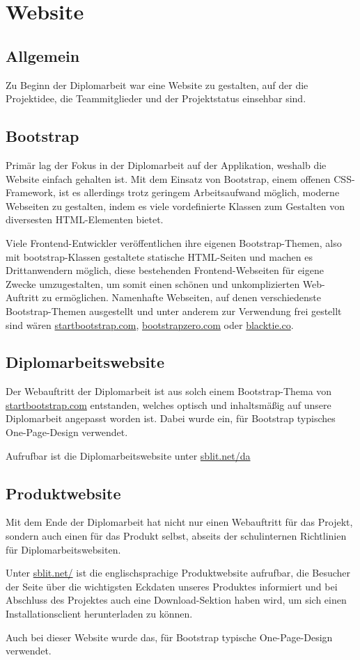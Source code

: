 \chapter{Website}
\section{Allgemein}
Zu Beginn der Diplomarbeit war eine Website zu gestalten, auf der die Projektidee,
die Teammitglieder und der Projektstatus einsehbar sind.

\section{Bootstrap}
Primär lag der Fokus in der Diplomarbeit auf der Applikation, weshalb die Website
einfach gehalten ist. Mit dem Einsatz von Bootstrap, einem offenen CSS-Framework,
ist es allerdings trotz geringem Arbeitsaufwand möglich, moderne Webseiten zu gestalten,
indem es viele vordefinierte Klassen zum Gestalten von diversesten HTML-Elementen bietet.

Viele Frontend-Entwickler veröffentlichen ihre eigenen Bootstrap-Themen, also
mit bootstrap-Klassen gestaltete statische HTML-Seiten und machen es Drittanwendern
möglich, diese bestehenden Frontend-Webseiten für eigene Zwecke umzugestalten,
um somit einen schönen und unkomplizierten Web-Auftritt zu ermöglichen. Namenhafte
Webseiten, auf denen verschiedenste Bootstrap-Themen ausgestellt und unter
anderem zur Verwendung frei gestellt sind wären \href{http://startbootstrap.com/}{startbootstrap.com},
\href{http://bootstrapzero.com/}{bootstrapzero.com} oder \href{http://blacktie.co/}{blacktie.co}.

\section{Diplomarbeitswebsite}
Der Webauftritt der Diplomarbeit ist aus solch einem Bootstrap-Thema von
\href{http://startbootstrap.com/}{startbootstrap.com} entstanden, welches optisch und inhaltsmäßig auf unsere
Diplomarbeit angepasst worden ist. Dabei wurde ein, für Bootstrap typisches
One-Page-Design verwendet.

Aufrufbar ist die Diplomarbeitswebsite unter \href{http://sblit.net/da/}{sblit.net/da}

\section{Produktwebsite}
Mit dem Ende der Diplomarbeit hat \sblit nicht nur einen Webauftritt für das Projekt,
sondern auch einen für das Produkt selbst, abseits der schulinternen Richtlinien für Diplomarbeitswebsiten.

Unter \href{http://sblit.net/}{sblit.net/} ist die englischsprachige Produktwebsite aufrufbar,
die Besucher der Seite über die wichtigsten Eckdaten unseres Produktes informiert und bei
Abschluss des Projektes auch eine Download-Sektion haben wird, um sich einen Installationsclient herunterladen zu können.

Auch bei dieser Website wurde das, für Bootstrap typische One-Page-Design verwendet.

